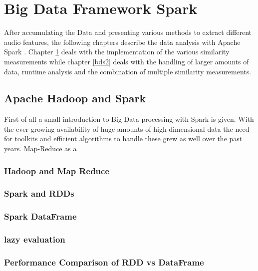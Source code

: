 
\chapter{Big Data Framework Spark}\label{bds1}

After accumulating the Data and presenting various methods to extract different audio features, the following chapters describe the data analysis with Apache Spark \cite{spark}. Chapter \ref{bds1} deals with the implementation of the various similarity measurements while chapter \ref{bds2} deals with the handling of larger amounts of data, runtime analysis and the combination of multiple similarity measurements. 

\section{Apache Hadoop and Spark} 

First of all a small introduction to Big Data processing with Spark is given.
With the ever growing availability of huge amounts of high dimensional data the need for toolkits and efficient algorithms to handle these grew as well over the past years. Map-Reduce as a 

\subsection{Hadoop and Map Reduce}

\subsection{Spark and RDDs}

\subsection{Spark DataFrame}

\subsection{lazy evaluation}

\subsection{Performance Comparison of RDD vs DataFrame}



